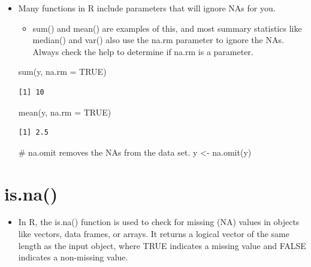 \documentclass[
  letterpaper,
  DIV=11,
  numbers=noendperiod]{scrreprt}
\newenvironment{Shaded}{\begin{snugshade}}{\end{snugshade}}
\newcommand{\AttributeTok}[1]{\textcolor[rgb]{0.40,0.45,0.13}{#1}}
\newcommand{\CommentTok}[1]{\textcolor[rgb]{0.37,0.37,0.37}{#1}}
\newcommand{\ConstantTok}[1]{\textcolor[rgb]{0.56,0.35,0.01}{#1}}
\newcommand{\FunctionTok}[1]{\textcolor[rgb]{0.28,0.35,0.67}{#1}}
\newcommand{\NormalTok}[1]{\textcolor[rgb]{0.00,0.23,0.31}{#1}}
\newcommand{\OtherTok}[1]{\textcolor[rgb]{0.00,0.23,0.31}{#1}}
\providecommand{\tightlist}{%
  \setlength{\itemsep}{0pt}\setlength{\parskip}{0pt}}\usepackage{longtable,booktabs,array}
\begin{document}
\begin{itemize}
\item
  Many functions in R include parameters that will ignore NAs for you.

  \begin{itemize}
  \tightlist
  \item
    sum() and mean() are examples of this, and most summary statistics
    like median() and var() also use the na.rm parameter to ignore the
    NAs. Always check the help to determine if na.rm is a parameter.
  \end{itemize}

\begin{Shaded}
\begin{Highlighting}[]
\FunctionTok{sum}\NormalTok{(y, }\AttributeTok{na.rm =} \ConstantTok{TRUE}\NormalTok{)}
\end{Highlighting}
\end{Shaded}

\begin{verbatim}
[1] 10
\end{verbatim}

\begin{Shaded}
\begin{Highlighting}[]
\FunctionTok{mean}\NormalTok{(y, }\AttributeTok{na.rm =} \ConstantTok{TRUE}\NormalTok{)}
\end{Highlighting}
\end{Shaded}

\begin{verbatim}
[1] 2.5
\end{verbatim}

\begin{Shaded}
\begin{Highlighting}[]
\CommentTok{\# na.omit removes the NAs from the data set.}
\NormalTok{y }\OtherTok{\textless{}{-}} \FunctionTok{na.omit}\NormalTok{(y)}
\end{Highlighting}
\end{Shaded}
\end{itemize}

\section{is.na()}\label{is.na}

\begin{itemize}
\tightlist
\item
  In R, the is.na() function is used to check for missing (NA) values in
  objects like vectors, data frames, or arrays. It returns a logical
  vector of the same length as the input object, where TRUE indicates a
  missing value and FALSE indicates a non-missing value.
\end{itemize}
\end{document}
